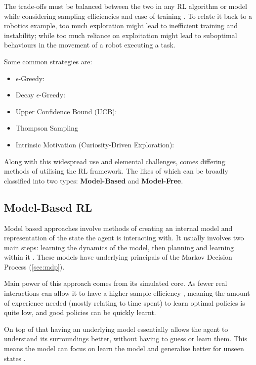   The trade-offs must be balanced between the two in any RL algorithm or model while considering sampling efficiencies and ease of training \cite{liu2019simpleexplorationsampleefficient}. To relate it back to a robotics example, too much exploration might lead to inefficient training and instability; while too much reliance on exploitation might lead to suboptimal behaviours in the movement of a robot executing a task. 

  Some common strategies are:
  \begin{itemize}
    \item $\epsilon$-Greedy:
    \item Decay $\epsilon$-Greedy:
    \item Upper Confidence Bound (UCB):
    \item Thompson Sampling
    \item Intrinsic Motivation (Curiosity-Driven Exploration):
  \end{itemize}
  
  Along with this widespread use and elemental challenges, comes differing methods of utilising the RL framework. The likes of which can be broadly classified into two types: \textbf{Model-Based} and \textbf{Model-Free}.
  
  \subsection{Model-Based RL}
  Model based approaches involve methods of creating an internal model and representation of the state the agent is interacting with. It usually involves two main steps: learning the dynamics of the model, then planning and learning within it \cite{MAL-086}. These models have underlying principals of the Markov Decision Process (\ref{sec:mdp}).

  Main power of this approach comes from its simulated core. As fewer real interactions can allow it to have a higher sample efficiency \cite{liu2021DRLminireview,wu23robotLearn}, meaning the amount of experience needed (mostly relating to time spent) to learn optimal policies is quite low, and good policies can be quickly learnt.

  On top of that having an underlying model essentially allows the agent to understand its surroundings better, without having to guess or learn them. This means the model can focus on learn the model and generalise better for unseen states \cite{MAL-086}.
  
